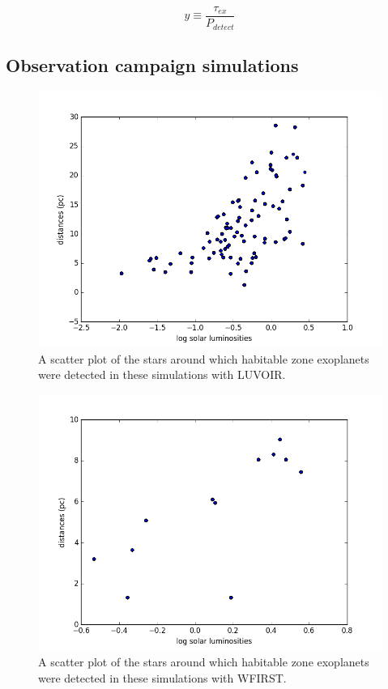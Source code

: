 \documentclass{article}
\begin{document}
	\begin{equation}
		y \equiv \frac{\tau_{ex}}{P_{detect}}
	\end{equation}
	
	\subsection{Observation campaign simulations}
	
	\begin{figure}
		\includegraphics[width = \linewidth]{LUVOIR_d_L_scatter.png}
		\caption{A scatter plot of the stars around which habitable zone exoplanets were detected in these simulations with LUVOIR.}
		\label{fig:LUVOIR_dL}
	\end{figure}
	
	\begin{figure}
		\includegraphics[width = \linewidth]{WFIRST_d_L_scatter.png}
		\caption{A scatter plot of the stars around which habitable zone exoplanets were detected in these simulations with WFIRST.}
		\label{fig:WFIRST_dL}
	\end{figure}
	
\end{document}
